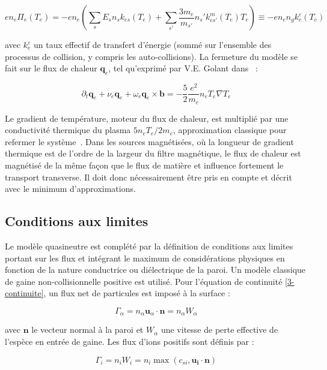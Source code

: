 \begin{refsection}
\begin{equation}
en_e\Pi_e(T_e)
=-en_e\left(\sum_{s}E_sn_sk_{es}(T_e)+\sum_{s'}\frac{3m_e}{m_{s'}}n_s'k^m_{es'}(T_e)T_e\right)
\equiv-en_en_gk^\varepsilon_e(T_e)
\end{equation}


avec $k_e^\varepsilon$ un taux effectif de transfert d'énergie (sommé sur 
l'ensemble des processus de collision, y compris les auto-collisions).
La fermeture du modèle se fait sur le flux de chaleur $\mathbf{q}_e$, tel qu'exprimé par V.E. Golant
dans~\parencite{Golant} :

\begin{equation}
\label{3-eqFluxChaleur}
\partial_t \mathbf{q}_e + \nu_e\mathbf{q}_e+\omega_e\mathbf{q}_e\times\mathbf{b} =
-\frac{5}{2}\frac{e^2}{m_e}n_eT_e\nabla T_e
\end{equation}

Le gradient de température, moteur du flux de chaleur, est multiplié par une
conductivité thermique du plasma $5n_eT_e/2m_e$, approximation classique pour
refermer le système~\parencite{bittencourt}.
Dans les sources magnétisées,
où la longueur de gradient thermique est de l'ordre de la largeur
du filtre magnétique, le flux de chaleur est magnétisé de la même façon que le
flux de matière et influence fortement le transport transverse. Il doit donc
nécessairement être pris en compte et décrit avec le minimum d'approximations.

\subsection{Conditions aux limites}
Le modèle quasineutre est complété par la
définition de conditions aux limites portant sur les flux et intégrant le
maximum de considérations physiques en fonction de la nature conductrice ou
diélectrique de la paroi.
Un modèle classique de gaine non-collisionnelle positive est utilisé. Pour
l'équation de continuité \eqref{3-continuite}, un flux net de
particules est imposé à la surface :

\begin{equation}
	\Gamma_\alpha=n_\alpha\mathbf u_\alpha\cdot \mathbf n=n_\alpha W_\alpha
\end{equation} 

avec $\mathbf{n}$ le vecteur normal à la paroi et $W_\alpha$ une vitesse de
perte effective de l'espèce en entrée de gaine. Les flux d'ions positifs sont
définis par :

\begin{equation}
\label{3-fluxIonique}
\Gamma_i=n_iW_i=n_i\max\left(c_{si},\mathbf{u_i}\cdot\mathbf{n}\right)
\end{equation}


\end{refsection}
